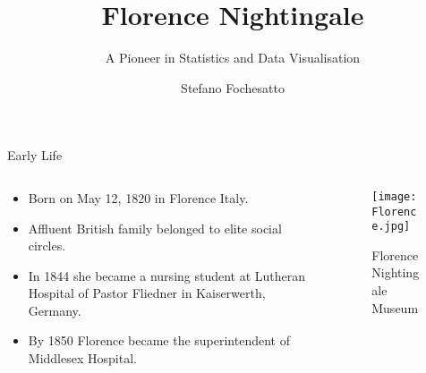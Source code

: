 \documentclass[10pt]{beamer}
\title{Florence Nightingale}
\subtitle{A Pioneer in Statistics and Data Visualisation}
\date{}
\author{Stefano Fochesatto}
\begin{document}
\maketitle

\begin{frame}{Early Life}
  \begin{columns}[T]
    \begin{column}{.60\textwidth}
   
      \begin{itemize}
        \item Born on May 12, 1820 in Florence Italy.
        \item Affluent British family belonged to elite social circles.
        \item In 1844 she became a nursing student at Lutheran Hospital of Pastor Fliedner in Kaiserwerth, Germany.
        \item By 1850 Florence became the superintendent of Middlesex Hospital. 
      \end{itemize}

    \end{column}
    \begin{column}{.40\textwidth}
  \begin{figure}
    \begin{center}
      \texttt{[image: Florence.jpg]}
    \caption{Florence Nightingale Museum}
    \end{center}
  \end{figure}
      \end{column}

 
    
  \end{columns}
\end{frame}
\end{document}
